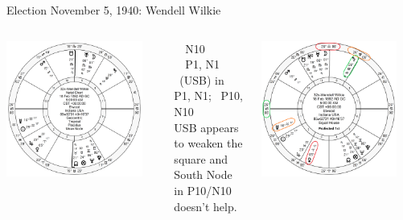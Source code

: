 \begin{frame}[t]{Election November 5, 1940: Wendell Wilkie}
\small
\begin{columns}[T, onlytextwidth]
\vspace{-1em}
{\includegraphics[width=0.9\textwidth]{charts/Wilkie.png}}
\fontsize{7pt}{8pt}\selectfont

\Saturn\, \Sextile\, N10 \\
\Venus\, \Sextile\, P1, N1 \\
\Mercury\, (USB) in P1, N1; \Square\, P10, N10 \\
\vspace{0.5em}
USB appears to weaken the square and South Node in P10/N10 doesn't help.

\vspace{-1em}
{\includegraphics[width=0.9\textwidth]{charts/Wilkie-Prof-1st.png}}


\end{columns}
\end{frame}

